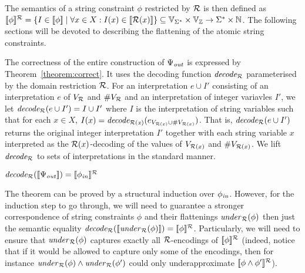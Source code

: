 \documentclass[sigplan,review,anonymous]{acmart}\settopmatter{printfolios=true,printccs=false,printacmref=false}
\begin{document}
The semantics of a string constraint $\phi$ restricted by $\mathcal{R}$ is then defined as 
$[\![\phi]\!]^{\mathcal{R}} = \{I\in[\![\phi]\!] \mid \forall x\in X:I(x)\in[\![\mathcal{R}(x)]\!]\} \subseteq \mbox{$\mathbb{V}_{\Sigma^*}$}\times \mbox{$\mathbb{V}_{\mathbb{Z}}$} \rightarrow \Sigma^* \times\mathbb{N}$.
The following sections will be devoted to describing the flattening of the atomic string constraints. 

The correctness of the entire construction of $\Psi_{\mathit{out}}$ is expressed by  Theorem~\ref{theorem:correct}. 
It uses the decoding function $\mathit{decode_{\mathcal{R}}}$ parameterised by the domain restriction $\mathcal{R}$. 
For an interpretation $e \cup I'$ consisting of an interpretation $e$ of $V_{\mathcal{R}}$ and $\#V_{\mathcal{R}}$ and an interpretation of integer variavles $I'$, we let $\mathit{decode_{\mathcal{R}}} (e\cup I') = I \cup I'$ where $I$ is the interpretation of string variables such that for each $x\in X$,
$I(x) = \mathit{decode_{\mathcal{R}(x)}} (e_{V_{\mathcal{R}(x)}\cup \#V_{\mathcal{R}(x)}})$. That is, $\mathit{decode_{\mathcal{R}}} (e\cup I')$ returns the original integer interpretation $I'$ together with each string variable $x$ interpreted as the ${\mathcal{R}(x)}$-decoding of the values of $V_{\mathcal{R}(x)}$ and $\#V_{\mathcal{R}(x)}$. 
We lift $\mathit{decode_{\mathcal{R}}}$ to sets of interpretations in the standard manner.
\begin{theorem}\label{theorem:correct}
$\mathit{decode_{\mathcal{R}}} ([\![\Psi_{\mathit{out}}]\!]) = [\![\phi_{\mathit{in}}]\!]^{\mathcal{R}}$ 
\end{theorem}

The theorem can be proved by a structural induction over $\phi_{\mathit{in}}$.
However, for the induction step to go through, we will need to guarantee a stronger correspondence of string constraints $\phi$ and their flattenings $\mathit{under}_{\mathcal{R}}(\phi)$ then just the semantic equality $\mathit{decode_{\mathcal{R}}} ([\![\mathit{under}_{\mathcal{R}}(\phi)]\!]) = [\![\phi]\!]^{\mathcal{R}}$.  
Particularly, we will need to
 ensure that $\mathit{under}_{\mathcal{R}}(\phi)$ captures exactly all $\mathcal{R}$-encodings of $[\![\phi]\!]^{\mathcal{R}}$
(indeed, notice that if it would be allowed to capture only some of the encodings, then for instance $\mathit{under}_{\mathcal{R}}(\phi) \land \mathit{under}_{\mathcal{R}}(\phi')$ could only underapproximate $[\![\phi\land\phi']\!]^{\mathcal{R}}$).

\end{document}
